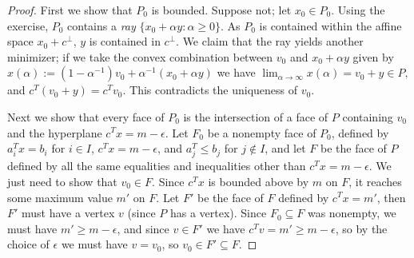 \documentclass[12pt]{article}
\newcommand{\lin}{\operatorname{lin}}
\newcommand{\rank}{\operatorname{rank}}
\begin{document}
\begin{proof}
First we show that $P_0$ is bounded. Suppose not; let $x_0 \in P_0$. Using the exercise, $P_0$ contains a \emph{ray} $\{x_0 + \alpha y: \alpha \geq 0\}$. As $P_0$ is contained within the affine space $x_0 + c^\perp$, $y$ is contained in $c^\perp$. We claim that the ray yields another minimizer; if we take the convex combination between $v_0$ and $x_0 + \alpha y$ given by 
$x(\alpha) := (1- \alpha^{-1}) v_0 + \alpha^{-1}(x_0 + \alpha y)$ we have $\lim_{\alpha \to \infty} x(\alpha) = v_0 + y \in P,$ and $c^T(v_0 + y) = c^T v_0.$ This contradicts the uniqueness of $v_0$.





Next we show that every face of $P_0$ is the intersection of a face of $P$ containing $v_0$ and the hyperplane $c^Tx = m-\epsilon$. Let $F_0$ be a nonempty face of $P_0$, defined by $a_i^Tx = b_i$ for $i \in I$, $c^Tx = m-\epsilon$, and $a_j^T \le b_j$ for $j \not\in I$, and let $F$ be the face of $P$ defined by all the same equalities and inequalities other than $c^Tx = m-\epsilon$. We just need to show that $v_0 \in F$. Since $c^Tx$ is bounded above by $m$ on $F$, it reaches some maximum value $m'$ on $F$. Let $F'$ be the face of $F$ defined by $c^Tx = m'$, then $F'$ must have a vertex $v$ (since $P$ has a vertex). Since $F_0 \subseteq F$ was nonempty, we must have $m' \ge m-\epsilon$, and since $v \in F'$ we have $c^Tv = m' \ge m-\epsilon$, so by the choice of $\epsilon$ we must have $v = v_0$, so $v_0 \in F' \subseteq F$.


\end{proof}
\end{document}
